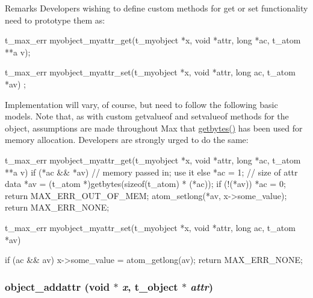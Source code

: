 \begin{DoxyRemark}{Remarks}
Developers wishing to define custom methods for {\ttfamily get} or {\ttfamily set} functionality need to prototype them as: 
\begin{DoxyCode}
    t_max_err myobject_myattr_get(t_myobject *x, void *attr, long *ac, t_atom **a
      v);
\end{DoxyCode}
 
\begin{DoxyCode}
    t_max_err myobject_myattr_set(t_myobject *x, void *attr, long ac, t_atom *av)
      ;
\end{DoxyCode}


Implementation will vary, of course, but need to follow the following basic models. Note that, as with custom {\ttfamily getvalueof} and {\ttfamily setvalueof} methods for the object, assumptions are made throughout Max that \hyperlink{group__memory_gaa513b95a076519ec168b62d85881f643}{getbytes()} has been used for memory allocation. Developers are strongly urged to do the same: 
\begin{DoxyCode}
    t_max_err myobject_myattr_get(t_myobject *x, void *attr, long *ac, t_atom **a
      v)
    {
        if (*ac && *av)
            // memory passed in; use it
        else {
            *ac = 1; // size of attr data
            *av = (t_atom *)getbytes(sizeof(t_atom) * (*ac));
            if (!(*av)) {
                *ac = 0;
                return MAX_ERR_OUT_OF_MEM;
            }
        }
        atom_setlong(*av, x->some_value);
        return MAX_ERR_NONE;
    }

    t_max_err myobject_myattr_set(t_myobject *x, void *attr, long ac, t_atom *av)
      
    {
        if (ac && av) {
            x->some_value = atom_getlong(av);
        }
        return MAX_ERR_NONE;
    }
\end{DoxyCode}
 
\end{DoxyRemark}
\hypertarget{group__attr_ga69d88788c952e914ecccd88179d0dfda}{
\subsubsection[{object\_\-addattr}]{ object\_\-addattr (void $\ast$ {\em x}, \/  {\bf t\_\-object} $\ast$ {\em attr})}}
\label{group__attr_ga69d88788c952e914ecccd88179d0dfda}


